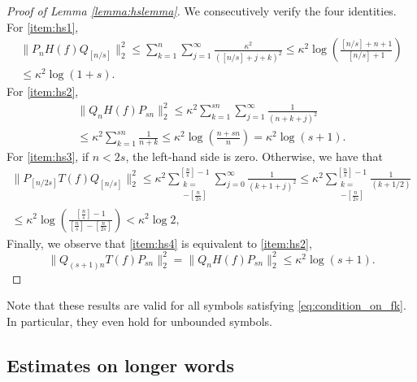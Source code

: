 \documentclass[11pt]{amsart}
\theoremstyle{plain}
\theoremstyle{remark}
\numberwithin{equation}{section}
\begin{document}
\begin{proof}[Proof of Lemma \ref{lemma:hslemma}]
We consecutively verify the four identities. For \eqref{item:hs1},
\begin{multline}
\|P_nH(f)Q_{[n/s]}\|_2^2\leq \sum_{k=1}^{n}\sum_{j=1}^{\infty}\frac{\kappa^2}{([n/s]+j+k)^2}\leq \kappa^2\log\left(\frac{[n/s]+n+1}{[n/s]+1}\right)
\\
\leq\kappa^2\log(1+s).
\end{multline}
For \eqref{item:hs2},
\begin{multline}
\|Q_nH(f) P_{sn}\|_2^2\leq  \kappa^2 \sum_{k=1}^{sn}\sum_{j=1}^{\infty} \frac{1}{(n+k+j)^2}
\\
\leq \kappa^2\sum_{k=1}^{sn}\frac{1}{n+k} \leq \kappa^2 \log
\left( 
\frac{n+sn}{n}
\right)
= \kappa^2\log(s+1).
\end{multline}
For \eqref{item:hs3}, if $n<2s$, the left-hand side is zero. Otherwise, we have that
\begin{multline}
\|P_{[n/2s]} T(f) Q_{[n/s]}\|_2^2\leq
\kappa^2\sum_{\substack{k=\\ [\frac{n}{s}] -[\frac{n}{2s}]
}}
^{[\frac{n}{s}]-1}
\sum_{j=0}^{\infty} \frac{1}{(k+1+j)^2}
\leq
\kappa^2\sum_{\substack{k=\\ [\frac{n}{s}] -[\frac{n}{2s}]
}}
^{[\frac{n}{s}]-1}
\frac{1}{(k+1/2)}
\\
\leq \kappa^2 \log\left(\frac{[\frac{n}{s}]-1}{[\frac{n}{s}]-[\frac{n}{2s}]}\right) < \kappa^2\log 2, 
\end{multline}
Finally, we observe that \eqref{item:hs4} is equivalent to \eqref{item:hs2}, 
\begin{equation}
\|Q_{(s+1)n}T(f)P_{sn}\|_2^2=\| Q_n H(f) P_{sn}\|_2^2\leq  \kappa^2\log(s+1).
\end{equation}

\end{proof}
Note that these results are valid for all symbols satisfying \eqref{eq:condition_on_fk}. In particular, they even hold for unbounded symbols. 
\subsection{Estimates on longer words}
\end{document}
